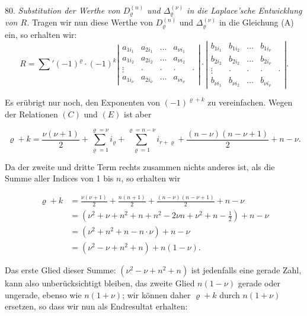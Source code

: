 80. \textit{Substitution der Werthe von $D_\varrho^{(n)}$ und $\varDelta_\varrho^{(\nu)}$ in
die Laplace'sche Entwicklung von $R$.} Tragen wir nun diese Werthe von
$D_\varrho^{(n)}$ und $\varDelta_\varrho^{(\nu)}$ in die Gleichung (A) ein, so
erhalten wir:
\[
R=\sum{}'(-1)^\varrho\cdot(-1)^k
\left|\begin{array}{ccccc}
a_{1i_1} & a_{2i_1} & \ldots & a_{\nu i_1}\\
a_{1i_2} & a_{2i_2} & \ldots & a_{\nu i_2}\\
\vdots & \cdot & \cdot & \cdot & \cdot\\
a_{1i_\nu} & a_{2i_\nu} & \ldots & a_{\nu i_\nu}
\end{array}\right|
\cdot
\left|\begin{array}{ccccc}
b_{1i_1} & b_{1i_2} & \ldots & b_{1i_\nu}\\
b_{2i_2} & b_{2i_2} & \ldots & b_{2i_\nu}\\
\vdots & \cdot & \cdot & \cdot & \cdot\\
b_{\nu i_1} & b_{\nu i_2} & \ldots & b_{\nu i_\nu}
\end{array}\right|.
\]



Es erübrigt nur noch, den Exponenten von $(-1)^{\varrho+k}$ zu vereinfachen. Wegen der Relationen $(C)$ und $(E)$ ist aber

\[
\varrho+k=\frac{\nu(\nu+1)}{2}+\sum_{\varrho=1}^{\varrho=\nu}i_\varrho+\sum_{\varrho=1}^{\varrho=n-\nu}i_{r+\varrho}+\frac{(n-\nu)(n-\nu+1)}{2}+n-\nu.
\]

Da der zweite und dritte Term rechts zusammen nichts anderes ist, als die Summe aller Indices von 1 bis $n$, so erhalten wir

\[
\begin{aligned}
\varrho+k&=\frac{\nu(\nu+1)}{2}+\frac{n(n+1)}{2}+\frac{(n-\nu)(n-\nu+1)}{2}+n-\nu\\
&=(\nu^2+\nu+n^2+n+n^2-2\nu n+\nu^2+n-\tfrac{1}{2})+n-\nu\\
&=(\nu^2+n^2+n-n\cdot\nu)+n-\nu\\
&=(\nu^2-\nu+n^2+n)+n(1-\nu).
\end{aligned}
\]

Das erste Glied dieser Summe: $(\nu^2-\nu+n^2+n)$ ist jedenfalls eine gerade Zahl, kann also unberücksichtigt bleiben, das zweite Glied $n(1-\nu)$ gerade oder ungerade, ebenso wie $n(1+\nu)$; wir können daher $\varrho+k$ durch $n(1+\nu)$ ersetzen, so dass wir nun als Endresultat erhalten:


